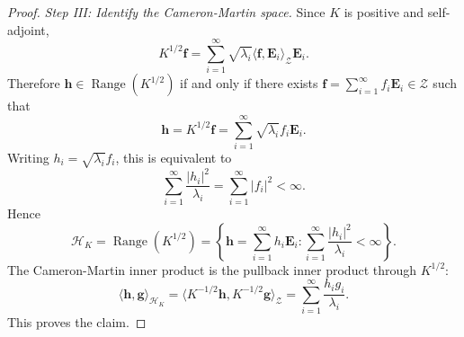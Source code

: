\documentclass[11pt]{article}
\begin{document}
\begin{proof}
\item\textit{Step III: Identify the Cameron-Martin space.} Since $K$ is positive and self-adjoint,
\[
    K^{1/2}\mathbf f
    =
    \sum_{i=1}^\infty \sqrt{\lambda_i}
    \langle \mathbf f,\mathbf E_i\rangle_{\mathcal Z}\mathbf E_i .
\]
Therefore $\mathbf h\in \operatorname{Range}(K^{1/2})$ if and only if there
exists $\mathbf f=\sum_{i=1}^\infty f_i\mathbf E_i\in\mathcal Z$ such that
\[
    \mathbf h=K^{1/2}\mathbf f
    =
    \sum_{i=1}^\infty \sqrt{\lambda_i}f_i\mathbf E_i .
\]
Writing $h_i=\sqrt{\lambda_i}f_i$, this is equivalent to
\[
    \sum_{i=1}^\infty \frac{|h_i|^2}{\lambda_i}
    =
    \sum_{i=1}^\infty |f_i|^2
    <\infty .
\]
Hence
\[
    \mathcal H_K
    =
    \operatorname{Range}(K^{1/2})
    =
    \left\{
        \mathbf h=\sum_{i=1}^\infty h_i\mathbf E_i:
        \sum_{i=1}^\infty \frac{|h_i|^2}{\lambda_i}<\infty
    \right\}.
\]
The Cameron-Martin inner product is the pullback inner product through
$K^{1/2}$:
\[
    \langle \mathbf h,\mathbf g\rangle_{\mathcal H_K}
    =
    \langle K^{-1/2}\mathbf h,K^{-1/2}\mathbf g\rangle_{\mathcal Z}
    =
    \sum_{i=1}^\infty \frac{h_i g_i}{\lambda_i}.
\]
This proves the claim.
\end{proof}
\end{document}
